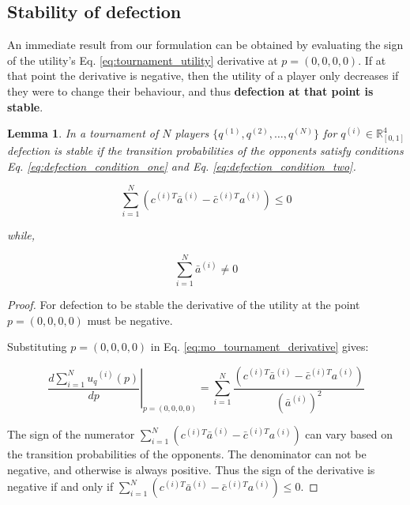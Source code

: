 \documentclass[9pt,twocolumn,twoside,lineno]{pnas-new}
\newcommand{\R}{\mathbb{R}}
\newtheorem{lemma}[theorem]{Lemma}
\begin{document}
\subsection*{Stability of defection}\label{subsection:stability_defection}

An immediate result from our formulation can be
obtained by evaluating the sign of the utility's Eq. \ref{eq:tournament_utility} derivative
at \(p=(0, 0, 0, 0)\). If at that point the
derivative is negative, then the utility of a player only decreases if they were
to change their behaviour, and thus \textbf{defection at that point is stable}.

\begin{lemma}\label{lemma:stability_of_defection}
    In a tournament of \(N\) players \(\{q^{(1)}, q^{(2)}, \dots, q^{(N)} \}\)
    for \(q^{(i)} \in \R_{[0, 1]} ^ 4\)
    defection is stable if the transition probabilities of the
    opponents satisfy conditions Eq. \ref{eq:defection_condition_one} and Eq. \ref{eq:defection_condition_two}.

    \begin{equation}\label{eq:defection_condition_one}
        \sum_{i=1} ^ N (c^{(i)T} \bar{a}^{(i)} - \bar{c}^{(i)T} a^{(i)}) \leq 0
    \end{equation}

    while,

    \begin{equation}\label{eq:defection_condition_two}
        \sum_{i=1} ^ N \bar{a}^{(i)} \neq 0
    \end{equation}
\end{lemma}

\begin{proof}
    For defection to be stable the derivative of the utility
    at the point \(p = (0, 0, 0, 0)\) must be negative.

    Substituting \(p = (0, 0, 0, 0)\) in
    Eq. \ref{eq:mo_tournament_derivative} gives:

    \begin{equation}
        \left.\frac{d\sum\limits_{i=1} ^ {N} {u_q}^{(i)} (p)}{dp} \right\rvert_{p=(0,0,0,0)} =
    \sum_{i=1} ^ N \frac{(c^{(i)T} \bar{a}^{(i)} - \bar{c}^{(i)T} a^{(i)})}
    {(\bar{a}^{(i)})^2}
    \end{equation}

    The sign of the numerator \( \displaystyle\sum_{i=1} ^ N (c^{(i)T} \bar{a}^{(i)} - \bar{c}^{(i)T} a^{(i)})\)
    can vary based on the transition probabilities of the opponents.
    The denominator can not be negative, and otherwise is always positive.
    Thus the sign of the derivative is negative if and only if
    \( \displaystyle\sum_{i=1} ^ N (c^{(i)T} \bar{a}^{(i)} - \bar{c}^{(i)T} a^{(i)}) \leq 0\).
\end{proof}
\end{document}
